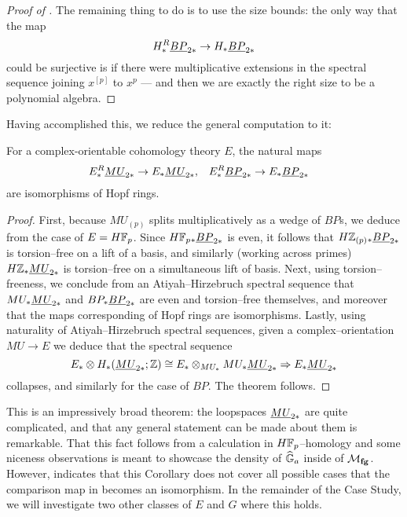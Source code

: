 \begin{proof}[{Proof of }]
The remaining thing to do is to use the size bounds: the only way that the map \[H_*^R \underline{\smash{BP}}_{2*} \to H_* \underline{\smash{BP}}_{2*}\] could be surjective is if there were multiplicative extensions in the spectral sequence joining $x^{[p]}$ to $x^p$ --- and then we are exactly the right size to be a polynomial algebra.
\end{proof}

Having accomplished this, we reduce the general computation to it:

\begin{corollary}
For a complex-orientable cohomology theory $E$, the natural maps
\begin{align*}
E_*^R \underline{\smash{MU}}_{2*} & \to E_* \underline{\smash{MU}}_{2*}, &
E_*^R \underline{\smash{BP}}_{2*} & \to E_* \underline{\smash{BP}}_{2*}
\end{align*}
are isomorphisms of Hopf rings.
\end{corollary}
\begin{proof}
First, because $MU_{(p)}$ splits multiplicatively as a wedge of $BP$s, we deduce from  the case of $E = H\mathbb F_p$.  Since $H\mathbb F_p{}_* \underline{\smash{BP}}_{2*}$ is even, it follows that $H\mathbb Z_{(p)}{}_* \underline{\smash{BP}}_{2*}$ is torsion--free on a lift of a basis, and similarly (working across primes) $H\mathbb Z_* \underline{\smash{MU}}_{2*}$ is torsion--free on a simultaneous lift of basis.  Next, using torsion--freeness, we conclude from an Atiyah--Hirzebruch spectral sequence that $MU_* \underline{\smash{MU}}_{2*}$ and $BP_* \underline{\smash{BP}}_{2*}$ are even and torsion--free themselves, and moreover that the maps corresponding of Hopf rings are isomorphisms.  Lastly, using naturality of Atiyah--Hirzebruch spectral sequences, given a complex--orientation $MU \to E$ we deduce that the spectral sequence \[E_* \otimes H_*(\underline{\smash{MU}}_{2*}; \mathbb Z) \cong E_* \otimes_{MU_*} MU_* \underline{\smash{MU}}_{2*} \Rightarrow E_* \underline{\smash{MU}}_{2*}\] collapses, and similarly for the case of $BP$.  The theorem follows.
\end{proof}

This is an impressively broad theorem: the loopspaces $\underline{\smash{MU}}_{2*}$ are quite complicated, and that any general statement can be made about them is remarkable.  That this fact follows from a calculation in $H\mathbb F_p$--homology and some niceness observations is meant to showcase the density of $\widehat{\mathbb G}_a$ inside of $\mathcal{M}_{\mathbf{fg}}$.  However,  indicates that this Corollary does not cover all possible cases that the comparison map in  becomes an isomorphism.  In the remainder of the Case Study, we will investigate two other classes of $E$ and $G$ where this holds.








